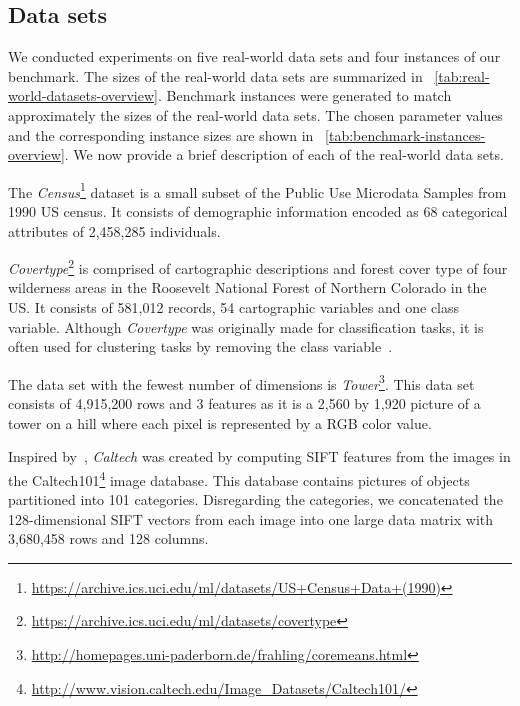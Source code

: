 \subsection{Data sets}
We conducted experiments on five real-world data sets and four instances of our benchmark. The sizes of the real-world data sets are summarized in ~\cref{tab:real-world-datasets-overview}. Benchmark instances were generated to match approximately the sizes of the real-world data sets. The chosen parameter values and the corresponding instance sizes are shown in ~\cref{tab:benchmark-instances-overview}. 
We now provide a brief description of each of the real-world data sets.

The \textit{Census}\footnote{\url{https://archive.ics.uci.edu/ml/datasets/US+Census+Data+(1990)}} dataset is a small subset of the Public Use Microdata Samples from 1990 US census. It consists of demographic information encoded as 68 categorical attributes of 2,458,285 individuals. 

\textit{Covertype}\footnote{\url{https://archive.ics.uci.edu/ml/datasets/covertype}} is comprised of cartographic descriptions and forest cover type of four wilderness areas in the Roosevelt National Forest of Northern Colorado in the US. It consists of 581,012 records, 54 cartographic variables and one class variable. Although \textit{Covertype} was originally made for classification tasks, it is often used for clustering tasks by removing the class variable~\cite{AckermannMRSLS12}.

The data set with the fewest number of dimensions is \textit{Tower}\footnote{\url{http://homepages.uni-paderborn.de/frahling/coremeans.html}}. This data set consists of 4,915,200 rows and 3 features as it is a 2,560 by 1,920 picture of a tower on a hill where each pixel is represented by a RGB color value. 



Inspired by~\cite{FGSSS13}, \textit{Caltech} was created by computing SIFT features from the images in the Caltech101\footnote{\url{http://www.vision.caltech.edu/Image_Datasets/Caltech101/}} image database. This database contains pictures of objects partitioned into 101 categories. Disregarding the categories, we concatenated the 128-dimensional SIFT vectors from each image into one large data matrix with 3,680,458 rows and 128 columns. 

